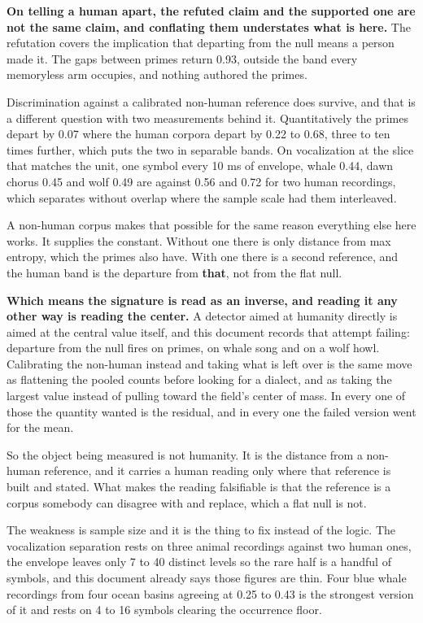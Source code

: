 \textbf{On telling a human apart, the refuted claim and the supported one are not the same claim, and conflating them understates what is here.} The refutation covers the implication that departing from the null means a person made it. The gaps between primes return 0.93, outside the band every memoryless arm occupies, and nothing authored the primes.

Discrimination against a calibrated non-human reference does survive, and that is a different question with two measurements behind it. Quantitatively the primes depart by 0.07 where the human corpora depart by 0.22 to 0.68, three to ten times further, which puts the two in separable bands. On vocalization at the slice that matches the unit, one symbol every 10 ms of envelope, whale 0.44, dawn chorus 0.45 and wolf 0.49 are against 0.56 and 0.72 for two human recordings, which separates without overlap where the sample scale had them interleaved.

A non-human corpus makes that possible for the same reason everything else here works. It supplies the constant. Without one there is only distance from max entropy, which the primes also have. With one there is a second reference, and the human band is the departure from \textbf{that}, not from the flat null.

\textbf{Which means the signature is read as an inverse, and reading it any other way is reading the center.} A detector aimed at humanity directly is aimed at the central value itself, and this document records that attempt failing: departure from the null fires on primes, on whale song and on a wolf howl. Calibrating the non-human instead and taking what is left over is the same move as flattening the pooled counts before looking for a dialect, and as taking the largest value instead of pulling toward the field's center of mass. In every one of those the quantity wanted is the residual, and in every one the failed version went for the mean.

So the object being measured is not humanity. It is the distance from a non-human reference, and it carries a human reading only where that reference is built and stated. What makes the reading falsifiable is that the reference is a corpus somebody can disagree with and replace, which a flat null is not.

The weakness is sample size and it is the thing to fix instead of the logic. The vocalization separation rests on three animal recordings against two human ones, the envelope leaves only 7 to 40 distinct levels so the rare half is a handful of symbols, and this document already says those figures are thin. Four blue whale recordings from four ocean basins agreeing at 0.25 to 0.43 is the strongest version of it and rests on 4 to 16 symbols clearing the occurrence floor.


